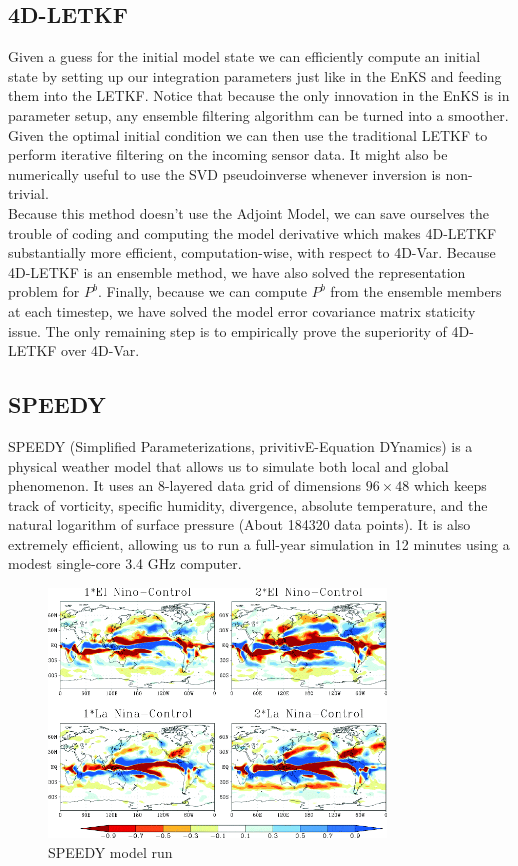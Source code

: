 \documentclass{article}
\begin{document}
\subsection{4D-LETKF}

Given a guess for the initial model state we can efficiently compute an initial state by setting up our integration parameters just like in the EnKS and feeding them into the LETKF. Notice that because the only innovation in the EnKS is in parameter setup, any ensemble filtering algorithm can be turned into a smoother. Given the optimal initial condition we can then use the traditional LETKF to perform iterative filtering on the incoming sensor data. It might also be numerically useful to use the SVD pseudoinverse whenever inversion is non-trivial. \\

Because this method doesn't use the Adjoint Model, we can save ourselves the trouble of coding and computing the model derivative which makes 4D-LETKF substantially more efficient, computation-wise, with respect to 4D-Var. Because 4D-LETKF is an ensemble method, we have also solved the representation problem for $P^b$. Finally, because we can compute $P^b$ from the ensemble members at each timestep, we have solved the model error covariance matrix staticity issue. The only remaining step is to empirically prove the superiority of 4D-LETKF over 4D-Var. \\

\subsection{SPEEDY}

SPEEDY \cite{SPEEDYTheory} (Simplified Parameterizations, privitivE-Equation DYnamics) is a physical weather model that allows us to simulate both local and global phenomenon. It uses an $8$-layered data grid of dimensions $96 \times 48$ which keeps track of vorticity, specific humidity, divergence, absolute temperature, and the natural logarithm of surface pressure (About 184320 data points). It is also extremely efficient, allowing us to run a full-year simulation in 12 minutes using a modest single-core 3.4 GHz computer.

\begin{figure}[H]
\begin{center}
\includegraphics[width=0.8\textwidth]{speedy}
\caption{SPEEDY model run \cite{Dogar2017}}
\end{center}
\end{figure}
\end{document}
